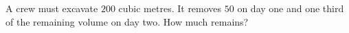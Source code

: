 A crew must excavate $200$ cubic metres. It removes $50$ on day one and one third of the remaining volume on day two. How much remains?
